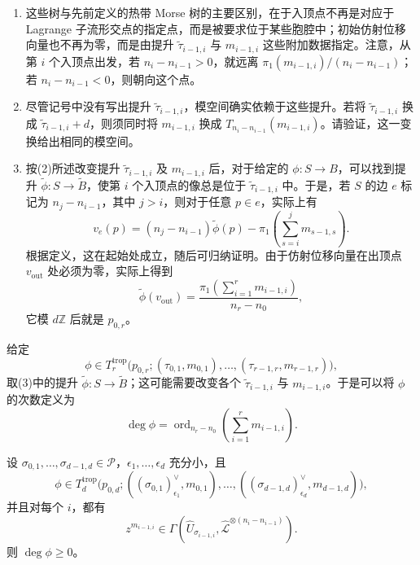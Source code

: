 \begin{note}[numbered]\label{note:8.30}
\begin{enumerate}
\item 这些树与先前定义的热带 Morse 树的主要区别，在于入顶点不再是对应于 Lagrange 子流形交点的指定点，而是被要求位于某些胞腔中；初始仿射位移向量也不再为零，而是由提升 $\widetilde\tau_{i-1,i}$ 与 $m_{i-1,i}$ 这些附加数据指定。注意，从第 $i$ 个入顶点出发，若 $n_i-n_{i-1}>0$，就远离 $\pi_1(m_{i-1,i})/(n_i-n_{i-1})$；若 $n_i-n_{i-1}<0$，则朝向这个点。
\item 尽管记号中没有写出提升 $\widetilde\tau_{i-1,i}$，模空间确实依赖于这些提升。若将 $\widetilde\tau_{i-1,i}$ 换成 $\widetilde\tau_{i-1,i}+d$，则须同时将 $m_{i-1,i}$ 换成 $T_{n_i-n_{i-1}}(m_{i-1,i})$。请验证，这一变换给出相同的模空间。
\item 按(2)所述改变提升 $\widetilde\tau_{i-1,i}$ 及 $m_{i-1,i}$ 后，对于给定的 $\phi\colon S\to B$，可以找到提升 $\widetilde\phi\colon S\to\widetilde B$，使第 $i$ 个入顶点的像总是位于 $\widetilde\tau_{i-1,i}$ 中。于是，若 $S$ 的边 $e$ 标记为 $n_j-n_{i-1}$，其中 $j>i$，则对于任意 $p\in e$，实际上有
\[
v_e(p)=(n_j-n_{i-1})\widetilde\phi(p)
-\pi_1\left(\sum_{s=i}^jm_{s-1,s}\right).
\]
根据定义，这在起始处成立，随后可归纳证明。由于仿射位移向量在出顶点 $v_{\mathrm{out}}$ 处必须为零，实际上得到
\[
\widetilde\phi(v_{\mathrm{out}})
=\frac{\pi_1(\sum_{i=1}^rm_{i-1,i})}{n_r-n_0},
\]
它模 $d\mathbb Z$ 后就是 $p_{0,r}$。
\end{enumerate}
\end{note}

\begin{definition}\label{def:8.31}
给定
\[
\phi\in T_r^{\mathrm{trop}}\bigl(p_{0,r};(\tau_{0,1},m_{0,1}),\ldots,
(\tau_{r-1,r},m_{r-1,r})\bigr),
\]
取(3)中的提升 $\widetilde\phi\colon S\to\widetilde B$；这可能需要改变各个 $\widetilde\tau_{i-1,i}$ 与 $m_{i-1,i}$。于是可以将 $\phi$ 的次数定义为
\[
\deg\phi=\operatorname{ord}_{n_r-n_0}
\left(\sum_{i=1}^rm_{i-1,i}\right).
\]
\end{definition}

\begin{proposition}\label{prop:8.32}
设 $\sigma_{0,1},\ldots,\sigma_{d-1,d}\in\mathcal P$，$\epsilon_1,\ldots,\epsilon_d$ 充分小，且
\[
\phi\in T_d^{\mathrm{trop}}\bigl(p_{0,d};
((\sigma_{0,1})_{\epsilon_1}^\vee,m_{0,1}),\ldots,
((\sigma_{d-1,d})_{\epsilon_d}^\vee,m_{d-1,d})\bigr),
\]
并且对每个 $i$，都有
\[
z^{m_{i-1,i}}\in
\Gamma(\widehat U_{\sigma_{i-1,i}},
\widehat{\mathcal L}^{\otimes(n_i-n_{i-1})}).
\]
则 $\deg\phi\geq0$。
\end{proposition}

